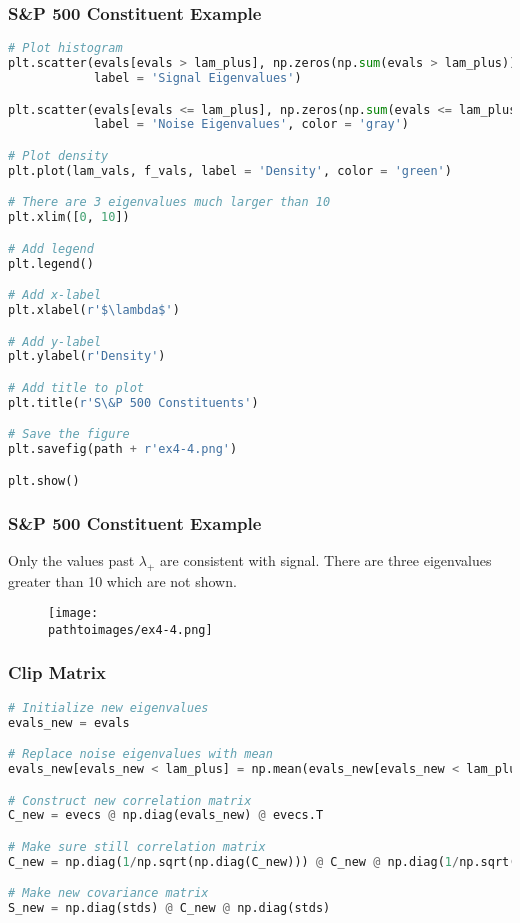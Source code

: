\documentclass{beamer}
\newcommand{\pathtoimages}{/Users/charlesrambo/Desktop/Bootcamp24/Images}
\begin{document}
\begin{frame}[fragile]
\frametitle{S\&P 500 Constituent Example}
\begin{lstlisting}[language=Python]
# Plot histogram
plt.scatter(evals[evals > lam_plus], np.zeros(np.sum(evals > lam_plus)), 
            label = 'Signal Eigenvalues')

plt.scatter(evals[evals <= lam_plus], np.zeros(np.sum(evals <= lam_plus)), 
            label = 'Noise Eigenvalues', color = 'gray')

# Plot density
plt.plot(lam_vals, f_vals, label = 'Density', color = 'green')

# There are 3 eigenvalues much larger than 10
plt.xlim([0, 10])

# Add legend
plt.legend()

# Add x-label
plt.xlabel(r'$\lambda$')

# Add y-label
plt.ylabel(r'Density')

# Add title to plot
plt.title(r'S\&P 500 Constituents')

# Save the figure
plt.savefig(path + r'ex4-4.png')

plt.show()
\end{lstlisting}
\end{frame}

\begin{frame}[fragile]
\frametitle{S\&P 500 Constituent Example}
Only the values past $\lambda_+$ are consistent with signal. There are three eigenvalues greater than 10 which are not shown.
\begin{figure}
\centering
\texttt{[image: \\pathtoimages/ex4-4.png]}
\end{figure}

\end{frame}


\begin{frame}[fragile]
\frametitle{Clip Matrix}
\begin{lstlisting}[language=Python]
# Initialize new eigenvalues
evals_new = evals

# Replace noise eigenvalues with mean
evals_new[evals_new < lam_plus] = np.mean(evals_new[evals_new < lam_plus])

# Construct new correlation matrix
C_new = evecs @ np.diag(evals_new) @ evecs.T

# Make sure still correlation matrix
C_new = np.diag(1/np.sqrt(np.diag(C_new))) @ C_new @ np.diag(1/np.sqrt(np.diag(C_new)))

# Make new covariance matrix
S_new = np.diag(stds) @ C_new @ np.diag(stds)
\end{lstlisting}
\end{frame}
\end{document}
